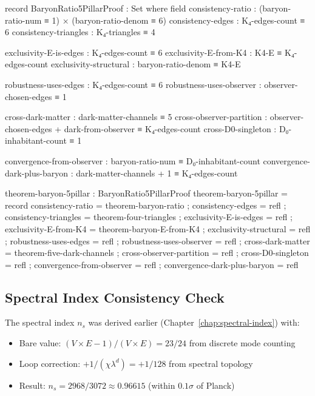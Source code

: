 \documentclass[11pt,a4paper]{book}
\begin{document}
\begin{code}
record BaryonRatio5PillarProof : Set where
  field
    consistency-ratio : (baryon-ratio-num ≡ 1) × (baryon-ratio-denom ≡ 6)
    consistency-edges : K₄-edges-count ≡ 6
    consistency-triangles : K₄-triangles ≡ 4
    
    exclusivity-E-is-edges : K₄-edges-count ≡ 6
    exclusivity-E-from-K4 : K4-E ≡ K₄-edges-count
    exclusivity-structural : baryon-ratio-denom ≡ K4-E
    
    robustness-uses-edges : K₄-edges-count ≡ 6
    robustness-uses-observer : observer-chosen-edges ≡ 1
    
    cross-dark-matter : dark-matter-channels ≡ 5
    cross-observer-partition : observer-chosen-edges + dark-from-observer ≡ K₄-edges-count
    cross-D0-singleton : D₀-inhabitant-count ≡ 1
    
    convergence-from-observer : baryon-ratio-num ≡ D₀-inhabitant-count
    convergence-dark-plus-baryon : dark-matter-channels + 1 ≡ K₄-edges-count

theorem-baryon-5pillar : BaryonRatio5PillarProof
theorem-baryon-5pillar = record
  { consistency-ratio = theorem-baryon-ratio
  ; consistency-edges = refl
  ; consistency-triangles = theorem-four-triangles
  ; exclusivity-E-is-edges = refl
  ; exclusivity-E-from-K4 = theorem-baryon-E-from-K4
  ; exclusivity-structural = refl
  ; robustness-uses-edges = refl
  ; robustness-uses-observer = refl
  ; cross-dark-matter = theorem-five-dark-channels
  ; cross-observer-partition = refl
  ; cross-D0-singleton = refl
  ; convergence-from-observer = refl
  ; convergence-dark-plus-baryon = refl
  }
\end{code}

\subsection{Spectral Index Consistency Check}

The spectral index $n_s$ was derived earlier (Chapter~\ref{chap:spectral-index}) with:
\begin{itemize}
  \item Bare value: $(V \times E - 1)/(V \times E) = 23/24$ from discrete mode counting
  \item Loop correction: $+1/(\chi \lambda^d) = +1/128$ from spectral topology
  \item Result: $n_s = 2968/3072 \approx 0.96615$ (within $0.1\sigma$ of Planck)
\end{itemize}
\end{document}
